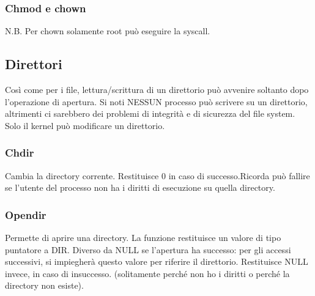 \documentclass{article}
\begin{document}
\subsubsection{Chmod e chown}

\noindent {} 
\medskip

\noindent  N.B. Per chown solamente root può eseguire la syscall.

\subsection{Direttori}
\noindent Così come per i file, lettura/scrittura di un direttorio può avvenire soltanto dopo l'operazione di apertura.
Si noti NESSUN processo può scrivere su un direttorio, altrimenti ci sarebbero dei problemi di integrità e di sicurezza del file system. 
Solo il kernel può modificare un direttorio.


\subsubsection{Chdir}
\noindent {} 
\medskip

\noindent Cambia la directory corrente. Restituisce 0 in caso di successo.Ricorda può fallire se l'utente del processo 
non ha i diritti di esecuzione su quella directory.

\subsubsection{Opendir}

\noindent {} 
\medskip

\noindent Permette di aprire una directory. La funzione restituisce un valore di tipo puntatore a DIR. Diverso da NULL se l'apertura ha successo: per gli accessi
successivi, si impiegherà questo valore per riferire il direttorio. Restituisce NULL invece, in caso di insuccesso.
(solitamente perché non ho i diritti o perché la directory non esiste).
\end{document}
